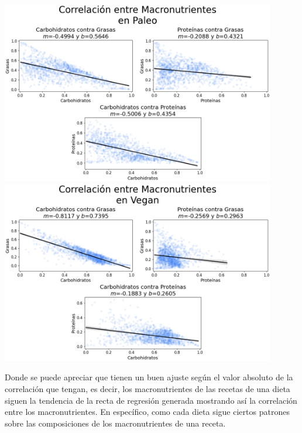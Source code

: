 \documentclass[12pt,a4paper]{article}
\begin{document}
{{\begin{center}
                \includegraphics[width=0.9\textwidth]{Resources/Bivariado/RegressionPaleo.png}\\
                \includegraphics[width=0.9\textwidth]{Resources/Bivariado/RegressionVegan.png}
            \end{center}

            Donde se puede apreciar que tienen un buen ajuste según el valor absoluto de la 
            correlación que tengan, es decir, los macronutrientes de las recetas de una dieta 
            siguen la tendencia de la recta de regresión generada mostrando así la correlación 
            entre los macronutrientes. En específico, como cada dieta sigue ciertos patrones 
            sobre las composiciones de los macronutrientes de una receta.
        }
    }

    \newpage
\end{document}
